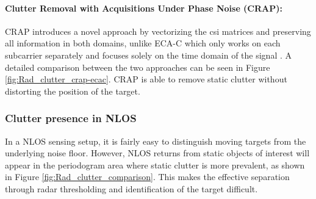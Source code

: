 	\paragraph{Clutter Removal with Acquisitions Under Phase Noise (CRAP):}
	CRAP introduces a novel approach by vectorizing the \gls{csi} matrices and preserving all information in both domains, unlike ECA-C which only works on each subcarrier separately and focuses solely on the time domain of the signal \cite{Henninger_CRAP_2023}.
	A detailed comparison between the two approaches can be seen in Figure \ref{fig:Rad_clutter_crap-ecac}. CRAP is able to remove static clutter without distorting the position of the target.
	
	
	\subsubsection{Clutter presence in NLOS}
	
	In a NLOS sensing setup, it is fairly easy to distinguish moving targets from the underlying noise floor.
	However, NLOS returns from static objects of interest will appear in the periodogram area where static clutter is more prevalent, as shown in Figure \ref{fig:Rad_clutter_comparison}.
	This makes the effective separation through radar thresholding and identification of the target difficult.

